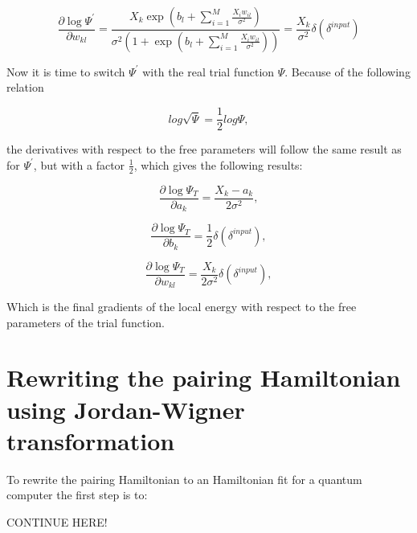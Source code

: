 \documentclass[../main.tex]{subfiles}
\begin{document}
\begin{equation}
	    \frac{\partial \log \Psi^{\prime}}{\partial w_{kl}}=\frac{X_k\exp\left(b_l+\sum_{i=1}^M \frac{X_iw_{il}}{\sigma^2}\right)}{\sigma^2\left(1+\exp \left( b_l + \sum_{i=1}^M \frac{X_iw_{il}}{\sigma^2}\right)\right)}=
	\frac{X_k}{\sigma^2}\delta(\delta^{input})
\end{equation}

Now it is time to switch $\Psi^{\prime}$ with the real trial function $\Psi$. Because of the following relation

\begin{equation*}
    log \sqrt{\Psi}=\frac{1}{2}log\Psi,
\end{equation*}

the derivatives with respect to the free parameters will follow the same result as for $\Psi^{\prime}$, but with a factor \ensuremath{\frac{1}{2}}, which gives the following results:

\begin{equation*}
	\frac{\partial \log \Psi_T }{\partial a_k}=\frac{X_k-a_k}{2\sigma^2},
\end{equation*}

\begin{equation*}
	    \frac{\partial \log \Psi_T}{\partial b_k}=\frac{1}{2}\delta(\delta^{input}),
\end{equation*}

\begin{equation*}
	    \frac{\partial \log \Psi_T}{\partial w_{kl}}=
	\frac{X_k}{2\sigma^2}\delta(\delta^{input}),
\end{equation*}

Which is the final gradients of the local energy with respect to the free parameters of the trial function.

\section{Rewriting the pairing Hamiltonian using Jordan-Wigner transformation}
To rewrite the pairing Hamiltonian to an Hamiltonian fit for a quantum computer the first step is to:

CONTINUE HERE!
\end{document}
